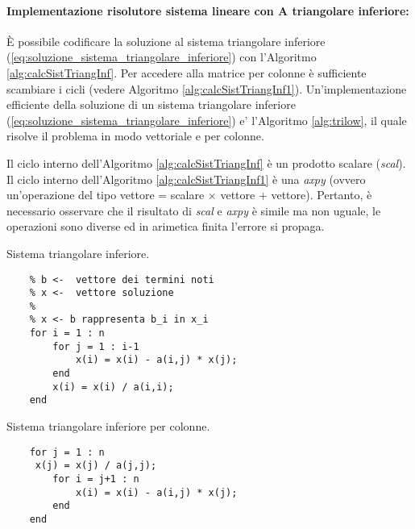 \paragraph{Implementazione risolutore sistema lineare con A triangolare inferiore:} È possibile codificare la soluzione al sistema triangolare inferiore (\ref{eq:soluzione_sistema_triangolare_inferiore}) con l'Algoritmo \ref{alg:calcSistTriangInf}. Per accedere alla matrice per colonne è sufficiente scambiare i cicli (vedere Algoritmo \ref{alg:calcSistTriangInf1}). Un'implementazione efficiente della soluzione di un sistema triangolare inferiore (\ref{eq:soluzione_sistema_triangolare_inferiore}) e' l'Algoritmo \ref{alg:trilow}, il quale risolve il problema in modo vettoriale e per colonne.

Il ciclo interno dell'Algoritmo \ref{alg:calcSistTriangInf} è un prodotto scalare (\textit{scal}). Il ciclo interno dell'Algoritmo \ref{alg:calcSistTriangInf1} è una \textit{axpy} (ovvero un'operazione del tipo vettore = scalare $\times$ vettore + vettore). Pertanto, è necessario osservare che il risultato di \textit{scal} e \textit{axpy} è simile ma non uguale, le operazioni sono diverse ed in arimetica finita l'errore si propaga.

\begin{algorithm}\caption{Sistema triangolare inferiore.}
\label{alg:calcSistTriangInf}
    \begin{lstlisting}[style=Matlab-editor]
    % a <-  matrice dei coefficienti
    % b <-  vettore dei termini noti
    % x <-  vettore soluzione
    %
    % x <- b rappresenta b_i in x_i
    for i = 1 : n
        for j = 1 : i-1
            x(i) = x(i) - a(i,j) * x(j);
        end
        x(i) = x(i) / a(i,i);
    end
    \end{lstlisting}
\end{algorithm}

\begin{algorithm}\caption{Sistema triangolare inferiore per colonne.}
\label{alg:calcSistTriangInf1}
    \begin{lstlisting}[style=Matlab-editor]
    % x <- b
    for j = 1 : n
     x(j) = x(j) / a(j,j);
        for i = j+1 : n
            x(i) = x(i) - a(i,j) * x(j);
        end
    end
    \end{lstlisting}
\end{algorithm}

